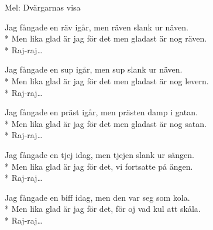 \begin{SongText}[Räven v2]
    \begin{SongInfo}
        Mel: Dvärgarnas visa
    \end{SongInfo}
    \begin{SongVerse}
        Jag fångade en räv igår, men räven slank ur näven.\\*%
        Men lika glad är jag för det men gladast är nog räven.\\*%
        Raj-raj…
    \end{SongVerse}
    \begin{SongVerse}
        Jag fångade en sup igår, men sup slank ur näven.\\*%
        Men lika glad är jag för det men gladast är nog levern.\\*%
        Raj-raj…
    \end{SongVerse}
    \begin{SongVerse}
        Jag fångade en präst igår, men prästen damp i gatan.\\*%
        Men lika glad är jag för det men gladast är nog satan.\\*%
        Raj-raj…
    \end{SongVerse}
    \begin{SongVerse}
        Jag fångade en tjej idag, men tjejen slank ur sängen.\\*%
        Men lika glad är jag för det, vi fortsatte på ängen.\\*%
        Raj-raj…
    \end{SongVerse}
    \begin{SongVerse}
        Jag fångade en biff idag, men den var seg som kola.\\*%
        Men lika glad är jag för det, för oj vad kul att skåla.\\*%
        Raj-raj…
    \end{SongVerse}
\end{SongText}
